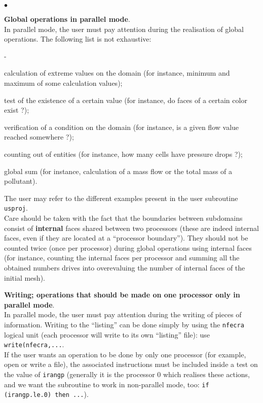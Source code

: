 {{{\begin{list}{$\bullet$}{}
\item {\bf Global operations in parallel mode}.\\
In parallel mode, the user must pay attention during the realisation of
      global operations. The following list is not exhaustive:
        \begin{list}{-}{}
\item calculation of extreme values on the domain (for instance, minimum
      and maximum of some calculation values);
\item test of the existence of a certain value (for instance, do faces
      of a certain color exist ?);
\item verification of a condition on the domain (for instance, is a
      given flow value reached somewhere ?);
\item counting out of entities (for instance, how many cells have
      pressure drops ?);
\item global sum (for instance, calculation of a mass flow or the total
      mass of a pollutant).
      \end{list}
The user may refer to the different examples present in the user
      subroutine \texttt{usproj}. \\
Care should be taken with the fact that the boundaries between
      subdomains consist of {\bf internal} faces shared between
      two processors (these are indeed internal faces, even if they are
      located at a ``processor boundary''). They should not be counted twice
      (once per processor) during global operations using internal faces
      (for instance, counting the internal faces per processor and
      summing all the obtained numbers drives into overevaluing the
      number of internal faces of the initial mesh).

\item {\bf Writing; operations that should be made on one
      processor only in parallel mode}.\\
In parallel mode, the user must pay attention during the writing of
      pieces of information. Writing to the ``listing'' can be done
      simply by using the \texttt{nfecra} logical unit (each processor will write
      to its own ``listing'' file): use
      \texttt{write(nfecra,...}. \\
If the user wants an operation to be done by only one processor (for
      example, open or write a file), the associated instructions must
      be included inside a test on the value of \texttt{irangp} (generally it is
      the processor 0 which realises these actions, and we want the
      subroutine to work in non-parallel mode, too: \texttt{if
      (irangp.le.0) then ...}).
\end{list}

}}}
